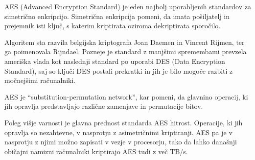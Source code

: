 AES (Advanced Encryption Standard) je eden najbolj uporabljenih standardov za simetrično enkripcijo. Simetrična enkripcija pomeni, da imata pošiljatelj in prejemnik isti ključ, s katerim kriptirata oziroma dekriptirata sporočilo. 

Algoritem sta razvila belgijska kriptografa Joan Daemen in Vincent Rijmen, ter ga poimenovala Rijndael. Pozneje je standard z manjšimi spremembami prevzela ameriška vlada kot naslednji standard po uporabi DES (Data Encryption Standard), saj so ključi DES postali prekratki in jih je bilo mogoče razbiti z močnejšimi računalniki.

AES je ``substitution-permutation network'', kar pomeni, da glavnino operacij, ki jih opravlja predstavljajo različne zamenjave in permutacije bitov.   

Poleg višje varnosti je glavna prednost standarda AES hitrost. Operacije, ki jih opravlja so nezahtevne, v nasprotju z asimetričnimi kriptiranji. AES pa je v nasprotju z njimi možno zapisati v vezje v procesorju, tako da lahko današnji običajni namizni računalniki kriptirajo AES tudi z več TB/s.

